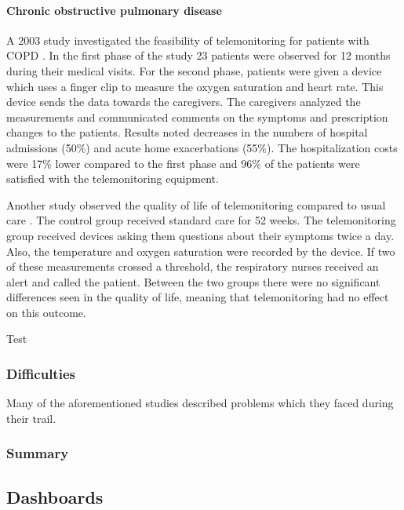         \paragraph{Chronic obstructive pulmonary disease} A 2003 study investigated the feasibility of telemonitoring for patients with COPD \cite{maiolo2003home}. In the first phase of the study 23 patients were observed for 12 months during their medical visits. For the second phase, patients were given a device which uses a finger clip to measure the oxygen saturation and heart rate. This device sends the data towards the caregivers. The caregivers analyzed the measurements and communicated comments on the symptoms and prescription changes to the patients. Results noted decreases in the numbers of hospital admissions (50\%) and acute home exacerbations (55\%). The hospitalization costs were 17\% lower compared to the first phase and 96\% of the patients were satisfied with the telemonitoring equipment.

        Another study observed the quality of life of telemonitoring compared to usual care \cite{lewis2010home}. The control group received standard care for 52 weeks. The telemonitoring group received devices asking them questions about their symptoms twice a day. Also, the temperature and oxygen saturation were recorded by the device. If two of these measurements crossed a threshold, the respiratory nurses received an alert and called the patient. Between the two groups there were no significant differences seen in the quality of life, meaning that telemonitoring had no effect on this outcome.

        \noindent Test


        \subsubsection{Difficulties}

        Many of the aforementioned studies described problems which they faced during their trail.

        \subsubsection{Summary}

    \subsection{Dashboards} \label{2_dashboards}


